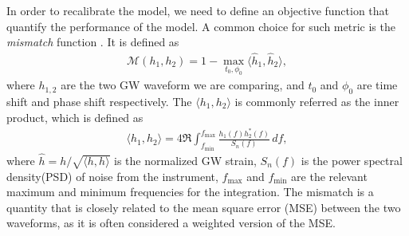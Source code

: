 \documentclass[twocolumn]{aastex631}
\begin{document}
In order to recalibrate the model, we need to define an objective function that
quantify the performance of the model. A common choice for such metric is the
\textit{mismatch} function \citep{husa2016frequency}. It is defined as
\begin{align} \label{eq:mismatch}
	\mathcal{M}(h_1, h_2)=1-\max_{t_0, \phi_0}\langle \hat{h}_1, \hat{h}_2\rangle,
\end{align}
where $h_{1,2}$ are the two GW waveform we are comparing, and $t_0$ and $\phi_0$
are time shift and phase shift respectively. The $\langle h_1, h_2 \rangle$ is
commonly referred as the inner product, which is defined as 
\begin{align}\label{eq:inner_prod}
	\langle h_1, h_2 \rangle = 4\Re\int_{f_{\mathrm{min}}}^{f_{\mathrm{max}}}\frac{h_1(f)h_2^{\ast}(f)}{S_n(f)}\,df,
\end{align}
where $\hat{h}=h/\sqrt{\langle h, h \rangle}$ is the normalized GW strain,
$S_n(f)$ is the power spectral density(PSD) of noise from the instrument, $f_{\mathrm{max}}$ and $f_{\mathrm{min}}$ are
the relevant maximum and minimum frequencies for the integration. The mismatch
is a quantity that is closely related to the mean square error (MSE) between the
two waveforms, as it is often considered a weighted version of the MSE. 
\end{document}
